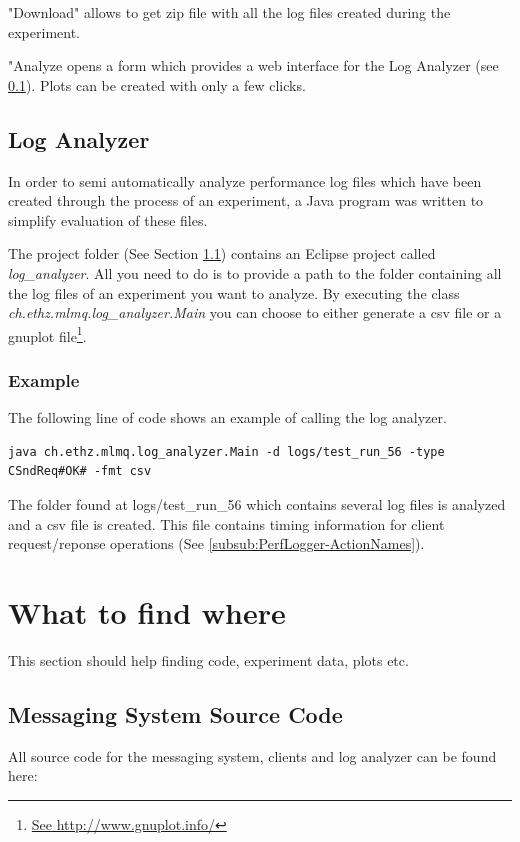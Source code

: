 \documentclass[a4paper]{article}
\begin{document}
"Download" allows to get zip file with all the log files created during the experiment.

"Analyze opens a form which provides a web interface for the Log Analyzer (see \ref{subsec:LogAnalyzer}). Plots can be created with only a few clicks.

\subsection{Log Analyzer}
\label{subsec:LogAnalyzer}

In order to semi automatically analyze performance log files which have been created through the process of an experiment, a Java program was written to simplify evaluation of these files.

The project folder (See Section \ref{sec:WhereToFind:MessagingSystemSrc}) contains an Eclipse project called \textit{log\_analyzer}. All you need to do is to provide a path to the folder containing all the log files of an experiment you want to analyze. By executing the class \textit{ch.ethz.mlmq.log\_analyzer.Main} you can choose to either generate a csv file or a gnuplot file\footnote{\url{See http://www.gnuplot.info/}}.


\subsubsection{Example}
The following line of code shows an example of calling the log analyzer.

\begin{verbatim}
java ch.ethz.mlmq.log_analyzer.Main -d logs/test_run_56 -type CSndReq#OK# -fmt csv
\end{verbatim}

The folder found at logs/test\_run\_56 which contains several log files is analyzed and a csv file is created. This file contains timing information for client request/reponse operations (See \ref{subsub:PerfLogger-ActionNames}).

\section{What to find where}

This section should help finding code, experiment data, plots etc.

\subsection{Messaging System Source Code}
\label{sec:WhereToFind:MessagingSystemSrc}
All source code for the messaging system, clients and log analyzer can be found here:
\end{document}
